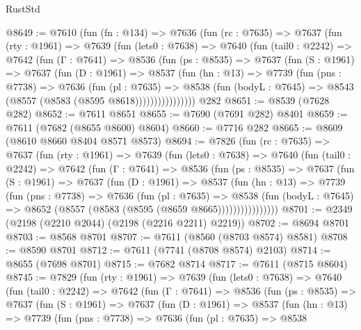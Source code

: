 \begin{lexlean}{RustStd}
\begin{coremodule}
{\begin{coremodule}
{{{{{{{{{{{{{{{{{{{{{{{{{{{{{{{{{{@8649 := @7610
    (fun (fn : @134) =>
    @7636
      (fun (rc : @7635) =>
      @7637
        (fun (rty : @1961) =>
        @7639
          (fun (lets0 : @7638) =>
          @7640
            (fun (tail0 : @2242) =>
            @7642
              (fun (Γ : @7641) =>
              @8536
                (fun (ps : @8535) =>
                @7637
                  (fun (S : @1961) =>
                  @7637
                    (fun (D : @1961) =>
                    @8537
                      (fun (hn : @13) =>
                      @7739
                        (fun (pns : @7738) =>
                        @7636
                          (fun (pl : @7635) =>
                          @8538
                            (fun (bodyL : @7645) => @8543 (@8557 (@8583 (@8595 @8618))))))))))))))))
    @282
@8651 := @8539 (@7628 @282)
@8652 := @7611 @8651
@8655 := @7690 (@7691 @282) @8401
@8659 := @7611 (@7682 (@8655 @8600) @8604)
@8660 := @7716 @282
@8665 := @8609 (@8610 @8660 @8404 @8571 @8573)
@8694 := @7826
    (fun (rc : @7635) =>
    @7637
      (fun (rty : @1961) =>
      @7639
        (fun (lets0 : @7638) =>
        @7640
          (fun (tail0 : @2242) =>
          @7642
            (fun (Γ : @7641) =>
            @8536
              (fun (ps : @8535) =>
              @7637
                (fun (S : @1961) =>
                @7637
                  (fun (D : @1961) =>
                  @8537
                    (fun (hn : @13) =>
                    @7739
                      (fun (pns : @7738) =>
                      @7636
                        (fun (pl : @7635) =>
                        @8538
                          (fun (bodyL : @7645) =>
                          @8652 (@8557 (@8583 (@8595 (@8659 @8665))))))))))))))))
@8701 := @2349 (@2198 (@2210 @2044) (@2198 (@2216 @2211) @2219))
@8702 := @8694 @8701
@8703 := @8568 @8701
@8707 := @7611 (@8560 (@8703 @8574) @8581)
@8708 := @8590 @8701
@8712 := @7611 (@7741 (@8708 @8574) @2103)
@8714 := @8655 (@7698 @8701)
@8715 := @7682 @8714
@8717 := @7611 (@8715 @8604)
@8745 := @7829
    (fun (rty : @1961) =>
    @7639
      (fun (lets0 : @7638) =>
      @7640
        (fun (tail0 : @2242) =>
        @7642
          (fun (Γ : @7641) =>
          @8536
            (fun (ps : @8535) =>
            @7637
              (fun (S : @1961) =>
              @7637
                (fun (D : @1961) =>
                @8537
                  (fun (hn : @13) =>
                  @7739
                    (fun (pns : @7738) =>
                    @7636
                      (fun (pl : @7635) =>
                      @8538
}}}}}}}}}}}}}}}}}}}}}}}}}}}}}}}}}}
\end{coremodule}}
\end{coremodule}
\end{lexlean}
